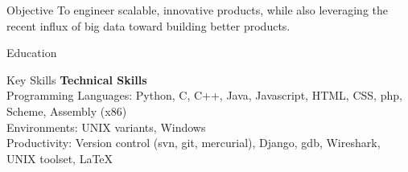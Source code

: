 \documentclass{resume}
\begin{document}
\maketitle
\thispagestyle{empty} %

\vspace{-0.5em}

\begin{component}{Objective}
To engineer scalable, innovative products, while also leveraging
the recent influx of big data toward building better products. \\
\end{component}

\vspace{-0.5em}

\begin{component}{Education}
\end{component}

\vspace{0.5em}

\begin{component}{Key Skills}
	\textbf{Technical Skills}\\
		Programming Languages: Python, C, C++, Java, Javascript, HTML, CSS, php, Scheme, Assembly (x86)\\
		Environments: UNIX variants, Windows \\
		Productivity: Version control (svn, git, mercurial), Django, gdb, Wireshark, UNIX toolset, LaTeX
\end{component}

\vspace{0.5em}
\end{document}
